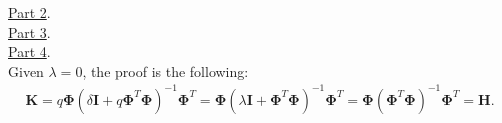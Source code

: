\documentclass[a4paper, 11pt]{article}\usepackage[]{graphicx}\usepackage[]{color}
\begin{document}
\newline \underline{Part 2}. \\
\newline \underline{Part 3}. \\
\newline \underline{Part 4}. \\
\newline Given $\lambda = 0$, the proof is the following:
\begin{eqnarray}
\mathbf{K} = q \mathbf{\Phi} (\delta \mathbf{I} + q \mathbf{\Phi}^T \mathbf{\Phi})^{-1} \mathbf{\Phi}^T = \mathbf{\Phi} (\lambda \mathbf{I} + \mathbf{\Phi}^T \mathbf{\Phi})^{-1} \mathbf{\Phi}^T = \mathbf{\Phi} (\mathbf{\Phi}^T \mathbf{\Phi})^{-1} \mathbf{\Phi}^T = \mathbf{H}. \nonumber
\end{eqnarray}
\end{document}
